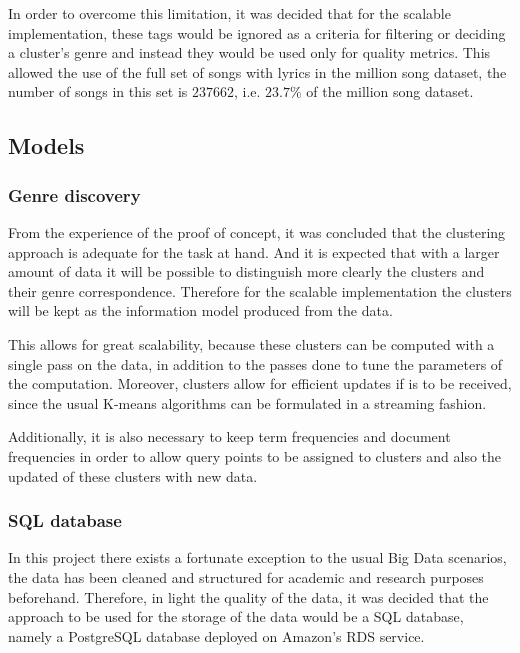 \documentclass[10pt,a4paper, twocolumn]{article}
\begin{document}
    In order to overcome this limitation, it was decided that for the scalable
    implementation, these tags would be ignored as a criteria for filtering or
    deciding a cluster's genre and instead they would be used only for quality
    metrics. This allowed the use of the full set of songs with lyrics in the
    million song dataset, the number of songs in this set is $237662$, i.e. 
    $23.7\%$ of the million song dataset.
    
    \subsection{Models}
    \subsubsection{Genre discovery}
    
    From the experience of the proof of concept, it was concluded that the
    clustering approach is adequate for the task at hand. And it is expected
    that with a larger amount of data it will be possible to distinguish
    more clearly the clusters and their genre correspondence. Therefore
    for the scalable implementation the clusters will be kept as the information
    model produced from the data.
    
    This allows for great scalability, because these clusters can be computed
    with a single pass on the data, in addition to the passes done to tune
    the parameters of the computation. Moreover, clusters allow for efficient
    updates if is to be received, since the usual K-means algorithms can
    be formulated in a streaming fashion.
    
    Additionally, it is also necessary to keep term frequencies and
    document frequencies in order to allow query points to be assigned
    to clusters and also the updated of these clusters with new data.
    
    \subsubsection{SQL database}
    In this project there exists a fortunate exception to the usual Big Data
    scenarios, the data has been cleaned and structured for academic and
    research purposes beforehand. Therefore, in light the quality of the data,
    it was decided that the approach to be used for the storage of the data would
    be a SQL database, namely a PostgreSQL database deployed on Amazon's RDS
    service.
 
\end{document}
